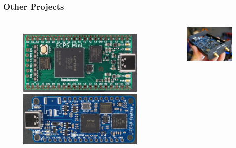 \documentclass[aspectratio=169, t]{beamer}
\begin{document}
\begin{frame}
\frametitle{Other Projects}
\vspace{-5mm}
\begin{columns}
	\begin{figure}
		\includegraphics[width=0.95\linewidth]{images/ecp5-front.JPG}
		\includegraphics[width=0.95\linewidth]{images/ice40.JPG}
	\end{figure}

	\vspace{5mm}
	\begin{figure}
		\includegraphics[width=\linewidth]{images/vna.jpg}
	\end{figure}
\end{columns}
\end{frame}
\end{document}
